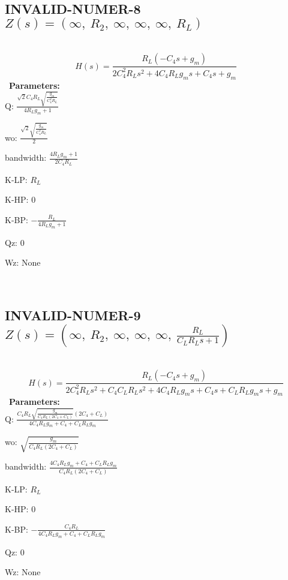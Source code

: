\documentclass{article}
\begin{document}
\ 

\subsection{INVALID-NUMER-8 $Z(s) = \left( \infty, \  R_{2}, \  \infty, \  \infty, \  \infty, \  R_{L}\right)$ } \ 
\textbf{\[H(s) = \frac{R_{L} \left(- C_{4} s + g_{m}\right)}{2 C_{4}^{2} R_{L} s^{2} + 4 C_{4} R_{L} g_{m} s + C_{4} s + g_{m}}\] } \ 
\textbf{Parameters:}\\ 

Q: $\frac{\sqrt{2} C_{4} R_{L} \sqrt{\frac{g_{m}}{C_{4}^{2} R_{L}}}}{4 R_{L} g_{m} + 1}$\ 

wo: $\frac{\sqrt{2} \sqrt{\frac{g_{m}}{C_{4}^{2} R_{L}}}}{2}$\ 

bandwidth: $\frac{4 R_{L} g_{m} + 1}{2 C_{4} R_{L}}$\ 

K-LP: $R_{L}$\ 

K-HP: $0$\ 

K-BP: $- \frac{R_{L}}{4 R_{L} g_{m} + 1}$\ 

Qz: $0$\ 

Wz: $\text{None}$\ 

\ 

\subsection{INVALID-NUMER-9 $Z(s) = \left( \infty, \  R_{2}, \  \infty, \  \infty, \  \infty, \  \frac{R_{L}}{C_{L} R_{L} s + 1}\right)$ } \ 
\textbf{\[H(s) = \frac{R_{L} \left(- C_{4} s + g_{m}\right)}{2 C_{4}^{2} R_{L} s^{2} + C_{4} C_{L} R_{L} s^{2} + 4 C_{4} R_{L} g_{m} s + C_{4} s + C_{L} R_{L} g_{m} s + g_{m}}\] } \ 
\textbf{Parameters:}\\ 

Q: $\frac{C_{4} R_{L} \sqrt{\frac{g_{m}}{C_{4} R_{L} \left(2 C_{4} + C_{L}\right)}} \left(2 C_{4} + C_{L}\right)}{4 C_{4} R_{L} g_{m} + C_{4} + C_{L} R_{L} g_{m}}$\ 

wo: $\sqrt{\frac{g_{m}}{C_{4} R_{L} \left(2 C_{4} + C_{L}\right)}}$\ 

bandwidth: $\frac{4 C_{4} R_{L} g_{m} + C_{4} + C_{L} R_{L} g_{m}}{C_{4} R_{L} \left(2 C_{4} + C_{L}\right)}$\ 

K-LP: $R_{L}$\ 

K-HP: $0$\ 

K-BP: $- \frac{C_{4} R_{L}}{4 C_{4} R_{L} g_{m} + C_{4} + C_{L} R_{L} g_{m}}$\ 

Qz: $0$\ 

Wz: $\text{None}$\ 
\end{document}
